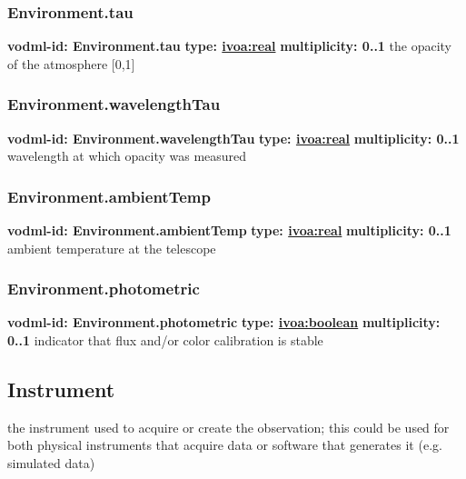     \subsubsection{Environment.tau}
      \textbf{vodml-id: Environment.tau} \newline
      \textbf{type: \hyperref[sect:ivoa]{ivoa:real}} \newline
      \textbf{multiplicity: 0..1} \newline
      the opacity of the atmosphere [0,1]

    \subsubsection{Environment.wavelengthTau}
      \textbf{vodml-id: Environment.wavelengthTau} \newline
      \textbf{type: \hyperref[sect:ivoa]{ivoa:real}} \newline
      \textbf{multiplicity: 0..1} \newline
      wavelength at which opacity was measured

    \subsubsection{Environment.ambientTemp}
      \textbf{vodml-id: Environment.ambientTemp} \newline
      \textbf{type: \hyperref[sect:ivoa]{ivoa:real}} \newline
      \textbf{multiplicity: 0..1} \newline
      ambient temperature at the telescope

    \subsubsection{Environment.photometric}
      \textbf{vodml-id: Environment.photometric} \newline
      \textbf{type: \hyperref[sect:ivoa]{ivoa:boolean}} \newline
      \textbf{multiplicity: 0..1} \newline
      indicator that flux and/or color calibration is stable

  \subsection{Instrument}
  \label{sect:Instrument}
    the instrument used to acquire or create the observation; this could be used for both physical instruments that acquire data or software that generates it (e.g. simulated data)

